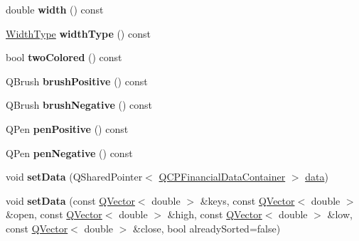 \begin{DoxyCompactItemize}
\item 
double {\bfseries width} () const \hypertarget{class_q_c_p_financial_a71ccaa04cdade0ec08a2117db6e4a4ce}{}\label{class_q_c_p_financial_a71ccaa04cdade0ec08a2117db6e4a4ce}

\item 
\hyperlink{class_q_c_p_financial_aef1761dda71a53dc5269685e9e492626}{Width\+Type} {\bfseries width\+Type} () const \hypertarget{class_q_c_p_financial_a25f86eaa756b12655af0f45d0e1e7168}{}\label{class_q_c_p_financial_a25f86eaa756b12655af0f45d0e1e7168}

\item 
bool {\bfseries two\+Colored} () const \hypertarget{class_q_c_p_financial_a2bab30fc4eee38a0da3a05846b8d7ac7}{}\label{class_q_c_p_financial_a2bab30fc4eee38a0da3a05846b8d7ac7}

\item 
Q\+Brush {\bfseries brush\+Positive} () const \hypertarget{class_q_c_p_financial_acb69536a334fae7fc31b2bfd4eca81f5}{}\label{class_q_c_p_financial_acb69536a334fae7fc31b2bfd4eca81f5}

\item 
Q\+Brush {\bfseries brush\+Negative} () const \hypertarget{class_q_c_p_financial_a91e09b31ce341c17b917e77fdc68d84e}{}\label{class_q_c_p_financial_a91e09b31ce341c17b917e77fdc68d84e}

\item 
Q\+Pen {\bfseries pen\+Positive} () const \hypertarget{class_q_c_p_financial_a544899bde79d06e17ccefcb9926d87ce}{}\label{class_q_c_p_financial_a544899bde79d06e17ccefcb9926d87ce}

\item 
Q\+Pen {\bfseries pen\+Negative} () const \hypertarget{class_q_c_p_financial_a557fe911aa04f70c1734c8fa09994148}{}\label{class_q_c_p_financial_a557fe911aa04f70c1734c8fa09994148}

\item 
void {\bfseries set\+Data} (Q\+Shared\+Pointer$<$ \hyperlink{class_q_c_p_data_container}{Q\+C\+P\+Financial\+Data\+Container} $>$ \hyperlink{class_q_c_p_financial_ad37e283817eff038a05ccba7ae22a630}{data})\hypertarget{class_q_c_p_financial_a72089e75b8a50d18097526c3c79fdb85}{}\label{class_q_c_p_financial_a72089e75b8a50d18097526c3c79fdb85}

\item 
void {\bfseries set\+Data} (const \hyperlink{class_q_vector}{Q\+Vector}$<$ double $>$ \&keys, const \hyperlink{class_q_vector}{Q\+Vector}$<$ double $>$ \&open, const \hyperlink{class_q_vector}{Q\+Vector}$<$ double $>$ \&high, const \hyperlink{class_q_vector}{Q\+Vector}$<$ double $>$ \&low, const \hyperlink{class_q_vector}{Q\+Vector}$<$ double $>$ \&close, bool already\+Sorted=false)\hypertarget{class_q_c_p_financial_a12992e669ed19d7bb48dbe601570cc05}{}\label{class_q_c_p_financial_a12992e669ed19d7bb48dbe601570cc05}


\end{DoxyCompactItemize}
